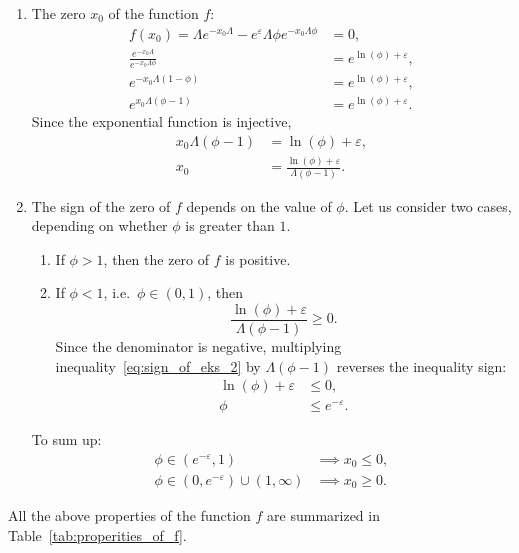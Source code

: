 \begin{enumerate}[label=\arabic*.]
\item The zero $x_0$ of the function $f$:
\begin{align*}
f(x_0) = \Lambda e^{-x_0\Lambda} - e^{\varepsilon}\Lambda\phi e^{-x_0\Lambda\phi} &= 0, \\
\frac{e^{-x_0\Lambda}}{e^{-x_0\Lambda\phi}} &= e^{\ln(\phi) + \varepsilon}, \\
e^{-x_0\Lambda(1-\phi)} &= e^{\ln(\phi) + \varepsilon}, \\
e^{x_0\Lambda(\phi-1)} &= e^{\ln(\phi) + \varepsilon}.
\end{align*}
Since the exponential function is injective,
\begin{align*}
x_0\Lambda(\phi-1) &= \ln(\phi) + \varepsilon, \\
x_0 &= \frac{\ln(\phi) + \varepsilon}{\Lambda(\phi-1)}.
\end{align*}

\item The sign of the zero of $f$ depends on the value of $\phi$. Let us consider two cases, depending on whether $\phi$ is greater than $1$.
\begin{enumerate}[label=(\alph*)]
  \item If $\phi > 1$, then the zero of $f$ is positive.
  \item If $\phi < 1$, i.e.\ $\phi \in (0, 1)$, then
  \begin{equation}
  \frac{\ln(\phi) + \varepsilon}{\Lambda(\phi-1)} \geq 0.
  \label{eq:sign_of_eks_2}
  \end{equation}
  Since the denominator is negative, multiplying inequality~\eqref{eq:sign_of_eks_2} by $\Lambda(\phi-1)$ reverses the inequality sign:
  \begin{align*}
  \ln(\phi) + \varepsilon &\leq 0, \\
  \phi &\leq e^{-\varepsilon}.
  \end{align*}
\end{enumerate}
To sum up:
\begin{align*}
\phi \in (e^{-\varepsilon}, 1) &\implies x_0 \leq 0, \\
\phi \in (0, e^{-\varepsilon}) \cup (1, \infty) &\implies x_0 \geq 0.
\end{align*}
\end{enumerate}

All the above properties of the function $f$ are summarized in Table~\ref{tab:properities_of_f}.

